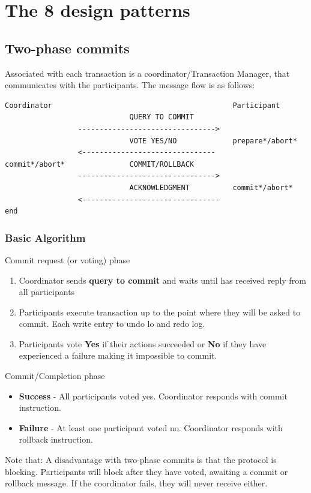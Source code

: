 \section{The 8 design patterns}
\subsection{Two-phase commits}
Associated with each transaction is a coordinator/Transaction Manager, that communicates with the participants. The message flow is as follows:
\begin{verbatim}
Coordinator                                          Participant
                             QUERY TO COMMIT
                 -------------------------------->
                             VOTE YES/NO             prepare*/abort*
                 <-------------------------------
commit*/abort*               COMMIT/ROLLBACK
                 -------------------------------->
                             ACKNOWLEDGMENT          commit*/abort*
                 <--------------------------------  
end
\end{verbatim}
\subsubsection{Basic Algorithm}
Commit request (or voting) phase 
\begin{enumerate}
\item Coordinator sends \textbf{query to commit} and waits until has received reply from all participants
\item Participants execute transaction up to the point where they will be asked to commit. Each write entry to undo lo and redo log.
\item Participants vote \textbf{Yes} if their actions succeeded or \textbf{No} if they have experienced a failure making it impossible to commit.
\end{enumerate}
Commit/Completion phase
\begin{itemize}
\item \textbf{Success} - All participants voted yes. Coordinator responds with commit instruction.
\item \textbf{Failure} - At least one participant voted no. Coordinator responds with rollback instruction.
\end{itemize}

Note that: A disadvantage with two-phase commits is that the protocol is blocking. Participants will block after they have voted, awaiting a commit or rollback
message. If the coordinator fails, they will never receive either.

